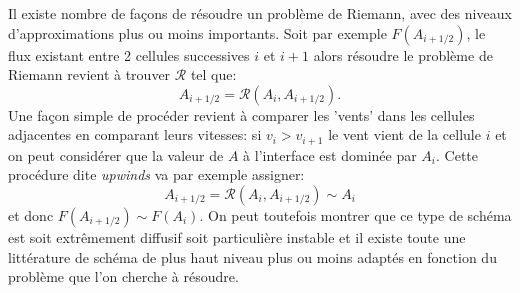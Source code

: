  Il existe nombre de façons de résoudre un problème de Riemann, avec des niveaux d'approximations plus ou moins importants. Soit par exemple $F(A_{i+1/2})$, le flux existant entre 2 cellules successives $i$ et $i+1$ alors résoudre le problème de Riemann revient à trouver $\mathcal R$ tel que:
 \begin{equation}
 A_{i+1/2}=\mathcal{R}(A_i, A_{i+1/2}).
 \end{equation}
 Une façon simple de procéder revient à comparer les 'vents' dans les cellules adjacentes en comparant leurs vitesses: si $v_i>v_{i+1}$ le vent vient de la cellule $i$ et on peut considérer que la valeur de $A$ à l'interface est dominée par $A_i$. Cette procédure dite \textit{upwinds} va par exemple assigner:
  \begin{equation}
 A_{i+1/2}=\mathcal{R}(A_i, A_{i+1/2})\sim A_i
 \end{equation}
 et donc $F(A_{i+1/2})\sim F(A_{i})$. On peut toutefois montrer que ce type de schéma est soit extrêmement diffusif soit particulière instable et il existe toute une littérature de schéma de plus haut niveau plus ou moins adaptés en fonction du problème que l'on cherche à résoudre.
 
